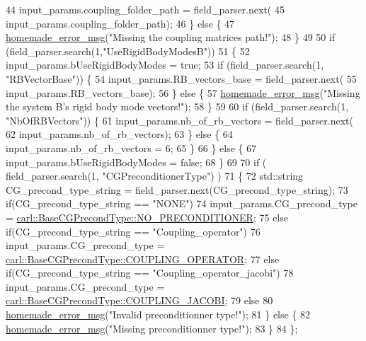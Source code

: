 \begin{DoxyCode}
44         input\_params.coupling\_folder\_path = field\_parser.next(
45                 input\_params.coupling\_folder\_path);
46     \} \textcolor{keywordflow}{else} \{
47         \hyperlink{common__header_8h_a05d65d26b911668ac90085745dca71f6}{homemade\_error\_msg}(\textcolor{stringliteral}{"Missing the coupling matrices path!"});
48     \}
49 
50     \textcolor{keywordflow}{if} (field\_parser.search(1,\textcolor{stringliteral}{"UseRigidBodyModesB"}))
51     \{
52         input\_params.bUseRigidBodyModes = \textcolor{keyword}{true};
53         \textcolor{keywordflow}{if} (field\_parser.search(1, \textcolor{stringliteral}{"RBVectorBase"})) \{
54             input\_params.RB\_vectors\_base = field\_parser.next(
55                     input\_params.RB\_vectors\_base);
56         \} \textcolor{keywordflow}{else} \{
57             \hyperlink{common__header_8h_a05d65d26b911668ac90085745dca71f6}{homemade\_error\_msg}(\textcolor{stringliteral}{"Missing the system B's rigid body mode vectors!"});
58         \}
59         
60         \textcolor{keywordflow}{if} (field\_parser.search(1, \textcolor{stringliteral}{"NbOfRBVectors"})) \{
61             input\_params.nb\_of\_rb\_vectors = field\_parser.next(
62                     input\_params.nb\_of\_rb\_vectors);
63         \} \textcolor{keywordflow}{else} \{
64             input\_params.nb\_of\_rb\_vectors = 6;
65         \}
66     \} \textcolor{keywordflow}{else} \{
67         input\_params.bUseRigidBodyModes = \textcolor{keyword}{false};
68     \}
69 
70     \textcolor{keywordflow}{if} ( field\_parser.search(1, \textcolor{stringliteral}{"CGPreconditionerType"}) )
71     \{
72         std::string CG\_precond\_type\_string = field\_parser.next(CG\_precond\_type\_string);
73         \textcolor{keywordflow}{if}(CG\_precond\_type\_string == \textcolor{stringliteral}{"NONE"})
74             input\_params.CG\_precond\_type = 
      \hyperlink{namespacecarl_ad52f21755b51ffa926038b59ae194ea8ad142a27fc7dfef6e36c5d01689880cc4}{carl::BaseCGPrecondType::NO\_PRECONDITIONER};
75         \textcolor{keywordflow}{else} \textcolor{keywordflow}{if}(CG\_precond\_type\_string == \textcolor{stringliteral}{"Coupling\_operator"})
76             input\_params.CG\_precond\_type = 
      \hyperlink{namespacecarl_ad52f21755b51ffa926038b59ae194ea8a0bdc3f2b24ccb8a7783e5cc3845f66f4}{carl::BaseCGPrecondType::COUPLING\_OPERATOR};
77         \textcolor{keywordflow}{else} \textcolor{keywordflow}{if}(CG\_precond\_type\_string == \textcolor{stringliteral}{"Coupling\_operator\_jacobi"})
78             input\_params.CG\_precond\_type = 
      \hyperlink{namespacecarl_ad52f21755b51ffa926038b59ae194ea8a9e4642aac714757473ea34db75279a99}{carl::BaseCGPrecondType::COUPLING\_JACOBI};
79         \textcolor{keywordflow}{else}
80             \hyperlink{common__header_8h_a05d65d26b911668ac90085745dca71f6}{homemade\_error\_msg}(\textcolor{stringliteral}{"Invalid preconditionner type!"});
81     \} \textcolor{keywordflow}{else} \{
82         \hyperlink{common__header_8h_a05d65d26b911668ac90085745dca71f6}{homemade\_error\_msg}(\textcolor{stringliteral}{"Missing preconditionner type!"});
83     \}
84 \};
\end{DoxyCode}
